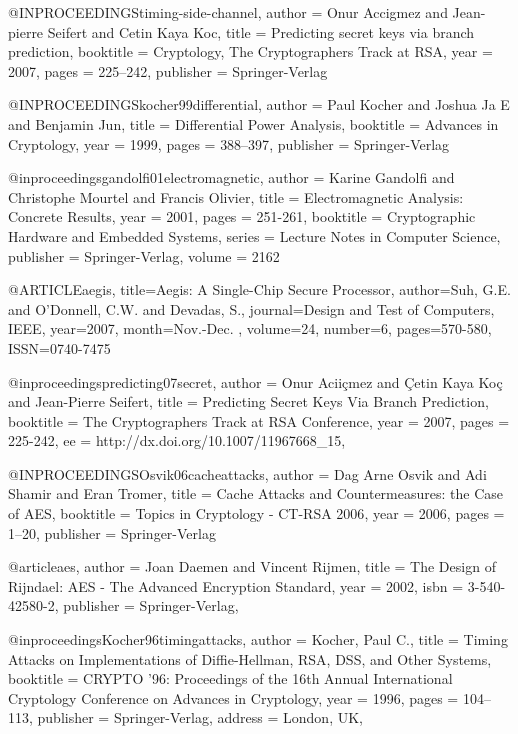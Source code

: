 @INPROCEEDINGS{timing-side-channel,
    author = {Onur Accigmez and Jean-pierre Seifert and Cetin Kaya Koc},
    title = {Predicting secret keys via branch prediction},
    booktitle = {Cryptology, The Cryptographers Track at RSA},
    year = {2007},
    pages = {225--242},
    publisher = {Springer-Verlag}
}   


@INPROCEEDINGS{kocher99differential,
    author = {Paul Kocher and Joshua Ja E and Benjamin Jun},
    title = {Differential Power Analysis},
    booktitle = {{Advances in Cryptology}},
    year = {1999},
    pages = {388--397},
    publisher = {Springer-Verlag}
}


@inproceedings{gandolfi01electromagnetic,
        author = {Karine Gandolfi and Christophe Mourtel and Francis Olivier},
        title = {{Electromagnetic Analysis: Concrete Results}},
        year = {2001},
        pages = {251-261},
        booktitle = {Cryptographic Hardware and Embedded Systems},
        series = {Lecture Notes in Computer Science},
        publisher = {Springer-Verlag},
        volume = {2162}
}


@ARTICLE{aegis,
title={Aegis: A Single-Chip Secure Processor},
author={Suh, G.E. and O'Donnell, C.W. and Devadas, S.},
journal={Design and Test of Computers, IEEE},
year={2007},
month={Nov.-Dec. },
volume={24},
number={6},
pages={570-580},
ISSN={0740-7475} }

@inproceedings{predicting07secret,
  author    = {Onur Acii\c{c}mez and
               \c{C}etin Kaya Ko\c{c} and
               Jean-Pierre Seifert},
  title     = {Predicting Secret Keys Via Branch Prediction},
  booktitle = {The Cryptographers Track at RSA Conference},
  year      = {2007},
  pages     = {225-242},
  ee        = {http://dx.doi.org/10.1007/11967668_15},
}

@INPROCEEDINGS{Osvik06cacheattacks,
    author = {Dag Arne Osvik and Adi Shamir and Eran Tromer},
    title = {Cache Attacks and Countermeasures: the Case of AES},
    booktitle = {Topics in Cryptology - CT-RSA 2006},
    year = {2006},
    pages = {1--20},
    publisher = {Springer-Verlag}
} 


@article{aes,
 author = {Joan Daemen and Vincent Rijmen},
 title = {The Design of Rijndael: AES - The Advanced Encryption Standard},
 year = {2002},
 isbn = {3-540-42580-2},
 publisher = {Springer-Verlag},
 }

@inproceedings{Kocher96timingattacks,
 author = {Kocher, Paul C.},
 title = {Timing Attacks on Implementations of Diffie-Hellman, RSA, DSS, and Other Systems},
 booktitle = {CRYPTO '96: Proceedings of the 16th Annual International Cryptology Conference on Advances in Cryptology},
 year = {1996},
 pages = {104--113},
 publisher = {Springer-Verlag},
 address = {London, UK},
}

